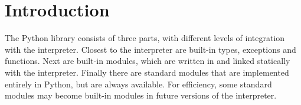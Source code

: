 \chapter{Introduction}

The Python library consists of three parts, with different levels of
integration with the interpreter.
Closest to the interpreter are built-in types, exceptions and functions.
Next are built-in modules, which are written in \C{} and linked statically
with the interpreter.
Finally there are standard modules that are implemented entirely in
Python, but are always available.
For efficiency, some standard modules may become built-in modules in
future versions of the interpreter.
